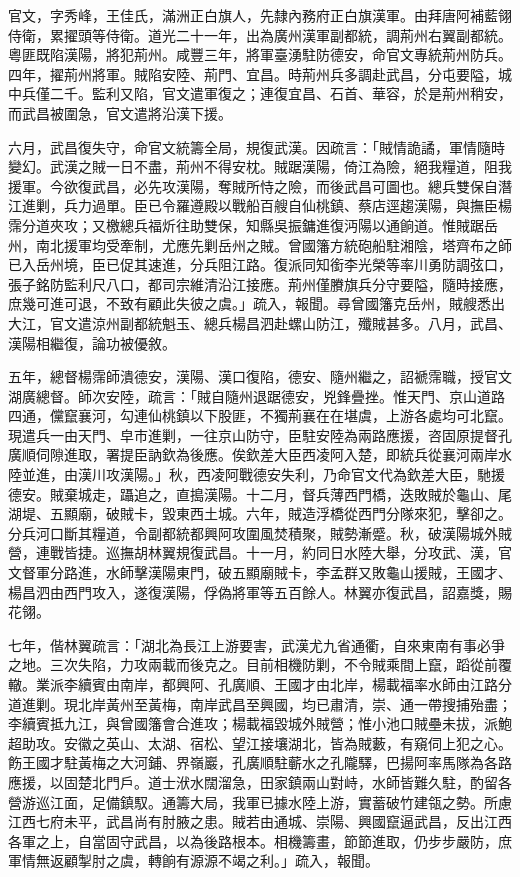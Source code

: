 \begin{pinyinscope}
官文，字秀峰，王佳氏，滿洲正白旗人，先隸內務府正白旗漢軍。由拜唐阿補藍翎侍衛，累擢頭等侍衛。道光二十一年，出為廣州漢軍副都統，調荊州右翼副都統。粵匪既陷漢陽，將犯荊州。咸豐三年，將軍臺湧駐防德安，命官文專統荊州防兵。四年，擢荊州將軍。賊陷安陸、荊門、宜昌。時荊州兵多調赴武昌，分屯要隘，城中兵僅二千。監利又陷，官文遣軍復之；連復宜昌、石首、華容，於是荊州稍安，而武昌被圍急，官文遣將沿漢下援。

六月，武昌復失守，命官文統籌全局，規復武漢。因疏言：「賊情詭譎，軍情隨時變幻。武漢之賊一日不盡，荊州不得安枕。賊踞漢陽，倚江為險，絕我糧道，阻我援軍。今欲復武昌，必先攻漢陽，奪賊所恃之險，而後武昌可圖也。總兵雙保自潛江進剿，兵力過單。臣已令羅遵殿以戰船百艘自仙桃鎮、蔡店逕趨漢陽，與撫臣楊霈分道夾攻；又檄總兵福炘往助雙保，知縣吳振鏞進復沔陽以通餉道。惟賊踞岳州，南北援軍均受牽制，尤應先剿岳州之賊。曾國籓方統砲船駐湘陰，塔齊布之師已入岳州境，臣已促其速進，分兵阻江路。復派同知銜李光榮等率川勇防調弦口，張子銘防監利尺八口，都司宗維清沿江接應。荊州僅賸旗兵分守要隘，隨時接應，庶幾可進可退，不致有顧此失彼之虞。」疏入，報聞。尋曾國籓克岳州，賊艘悉出大江，官文遣涼州副都統魁玉、總兵楊昌泗赴螺山防江，殲賊甚多。八月，武昌、漢陽相繼復，論功被優敘。

五年，總督楊霈師潰德安，漢陽、漢口復陷，德安、隨州繼之，詔褫霈職，授官文湖廣總督。師次安陸，疏言：「賊自隨州退踞德安，兇鋒疊挫。惟天門、京山道路四通，儻竄襄河，勾連仙桃鎮以下股匪，不獨荊襄在在堪虞，上游各處均可北竄。現遣兵一由天門、皁市進剿，一往京山防守，臣駐安陸為兩路應援，咨固原提督孔廣順伺隙進取，署提臣訥欽為後應。俟欽差大臣西凌阿入楚，即統兵從襄河兩岸水陸並進，由漢川攻漢陽。」秋，西凌阿戰德安失利，乃命官文代為欽差大臣，馳援德安。賊棄城走，躡追之，直搗漢陽。十二月，督兵薄西門橋，迭敗賊於龜山、尾湖堤、五顯廟，破賊卡，毀東西土城。六年，賊造浮橋從西門分隊來犯，擊卻之。分兵河口斷其糧道，令副都統都興阿攻圍風焚積聚，賊勢漸蹙。秋，破漢陽城外賊營，連戰皆捷。巡撫胡林翼規復武昌。十一月，約同日水陸大舉，分攻武、漢，官文督軍分路進，水師擊漢陽東門，破五顯廟賊卡，李孟群又敗龜山援賊，王國才、楊昌泗由西門攻入，遂復漢陽，俘偽將軍等五百餘人。林翼亦復武昌，詔嘉獎，賜花翎。

七年，偕林翼疏言：「湖北為長江上游要害，武漢尤九省通衢，自來東南有事必爭之地。三次失陷，力攻兩載而後克之。目前相機防剿，不令賊乘間上竄，蹈從前覆轍。業派李續賓由南岸，都興阿、孔廣順、王國才由北岸，楊載福率水師由江路分道進剿。現北岸黃州至黃梅，南岸武昌至興國，均已肅清，崇、通一帶搜捕殆盡；李續賓抵九江，與曾國籓會合進攻；楊載福毀城外賊營；惟小池口賊壘未拔，派鮑超助攻。安徽之英山、太湖、宿松、望江接壤湖北，皆為賊藪，有窺伺上犯之心。飭王國才駐黃梅之大河鋪、界嶺巖，孔廣順駐蘄水之孔隴驛，巴揚阿率馬隊為各路應援，以固楚北門戶。道士洑水闊溜急，田家鎮兩山對峙，水師皆難久駐，酌留各營游巡江面，足備鎮馭。通籌大局，我軍已據水陸上游，實蓄破竹建瓴之勢。所慮江西七府未平，武昌尚有肘腋之患。賊若由通城、崇陽、興國竄逼武昌，反出江西各軍之上，自當固守武昌，以為後路根本。相機籌畫，節節進取，仍步步嚴防，庶軍情無返顧掣肘之虞，轉餉有源源不竭之利。」疏入，報聞。


\end{pinyinscope}
